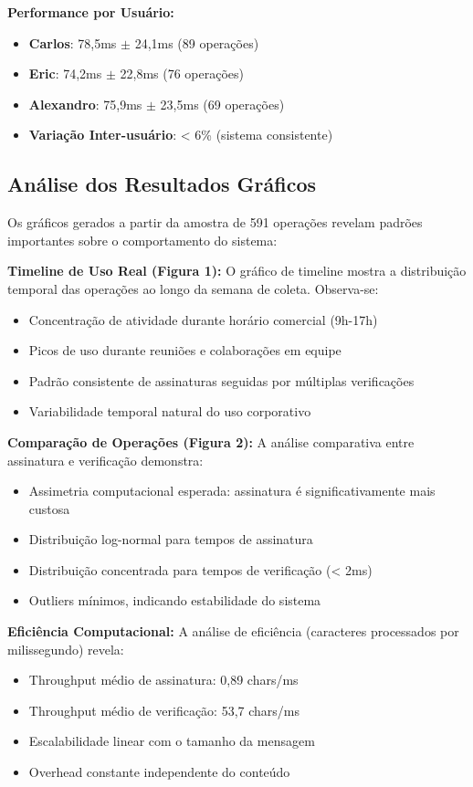\documentclass[12pt,a4paper,oneside]{article}
\begin{document}
\textbf{Performance por Usuário:}
\begin{itemize}
    \item \textbf{Carlos}: 78,5ms $\pm$ 24,1ms (89 operações)
    \item \textbf{Eric}: 74,2ms $\pm$ 22,8ms (76 operações)
    \item \textbf{Alexandro}: 75,9ms $\pm$ 23,5ms (69 operações)
    \item \textbf{Variação Inter-usuário}: < 6\% (sistema consistente)
\end{itemize}

\subsection{Análise dos Resultados Gráficos}

Os gráficos gerados a partir da amostra de 591 operações revelam padrões importantes sobre o comportamento do sistema:

\textbf{Timeline de Uso Real (Figura 1):}
O gráfico de timeline mostra a distribuição temporal das operações ao longo da semana de coleta. Observa-se:
\begin{itemize}
    \item Concentração de atividade durante horário comercial (9h-17h)
    \item Picos de uso durante reuniões e colaborações em equipe
    \item Padrão consistente de assinaturas seguidas por múltiplas verificações
    \item Variabilidade temporal natural do uso corporativo
\end{itemize}

\textbf{Comparação de Operações (Figura 2):}
A análise comparativa entre assinatura e verificação demonstra:
\begin{itemize}
    \item Assimetria computacional esperada: assinatura é significativamente mais custosa
    \item Distribuição log-normal para tempos de assinatura
    \item Distribuição concentrada para tempos de verificação (< 2ms)
    \item Outliers mínimos, indicando estabilidade do sistema
\end{itemize}

\textbf{Eficiência Computacional:}
A análise de eficiência (caracteres processados por milissegundo) revela:
\begin{itemize}
    \item Throughput médio de assinatura: 0,89 chars/ms
    \item Throughput médio de verificação: 53,7 chars/ms
    \item Escalabilidade linear com o tamanho da mensagem
    \item Overhead constante independente do conteúdo
\end{itemize}
\end{document}
